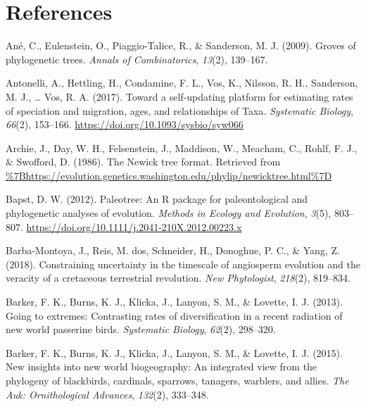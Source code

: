 \documentclass[
  english,
  man]{apa6}
\newlength{\cslhangindent}
\newlength{\cslentryspacingunit} %
\newenvironment{CSLReferences}[2] %
 {%
  \setlength{\parindent}{0pt}
  \ifodd #1
  \let\oldpar\par
  \def\par{\hangindent=\cslhangindent\oldpar}
  \fi
  \setlength{\parskip}{#2\cslentryspacingunit}
 }%
 {}
\begin{document}
\newpage

\hypertarget{references}{%
\section{References}\label{references}}

\begingroup
\setlength{\parindent}{-0.5in}
\setlength{\leftskip}{0.5in}

\hypertarget{refs}{}
\begin{CSLReferences}{1}{0}
\leavevmode{}%
Ané, C., Eulenstein, O., Piaggio-Talice, R., \& Sanderson, M. J. (2009). Groves of phylogenetic trees. \emph{{Annals of Combinatorics}}, \emph{13}(2), 139--167.

\leavevmode{}%
Antonelli, A., Hettling, H., Condamine, F. L., Vos, K., Nilsson, R. H., Sanderson, M. J., \ldots{} Vos, R. A. (2017). {Toward a self-updating platform for estimating rates of speciation and migration, ages, and relationships of Taxa}. \emph{Systematic Biology}, \emph{66}(2), 153--166. \url{https://doi.org/10.1093/sysbio/syw066}

\leavevmode{}%
Archie, J., Day, W. H., Felsenstein, J., Maddison, W., Meacham, C., Rohlf, F. J., \& Swofford, D. (1986). {The Newick tree format}. Retrieved from \url{\%7Bhttps://evolution.genetics.washington.edu/phylip/newicktree.html\%7D}

\leavevmode{}%
Bapst, D. W. (2012). {Paleotree: An R package for paleontological and phylogenetic analyses of evolution}. \emph{{Methods in Ecology and Evolution}}, \emph{3}(5), 803--807. \url{https://doi.org/10.1111/j.2041-210X.2012.00223.x}

\leavevmode{}%
Barba-Montoya, J., Reis, M. dos, Schneider, H., Donoghue, P. C., \& Yang, Z. (2018). Constraining uncertainty in the timescale of angiosperm evolution and the veracity of a cretaceous terrestrial revolution. \emph{New Phytologist}, \emph{218}(2), 819--834.

\leavevmode{}%
Barker, F. K., Burns, K. J., Klicka, J., Lanyon, S. M., \& Lovette, I. J. (2013). Going to extremes: Contrasting rates of diversification in a recent radiation of new world passerine birds. \emph{{Systematic Biology}}, \emph{62}(2), 298--320.

\leavevmode{}%
Barker, F. K., Burns, K. J., Klicka, J., Lanyon, S. M., \& Lovette, I. J. (2015). New insights into new world biogeography: An integrated view from the phylogeny of blackbirds, cardinals, sparrows, tanagers, warblers, and allies. \emph{{The Auk: Ornithological Advances}}, \emph{132}(2), 333--348.


\end{CSLReferences}
\end{document}

